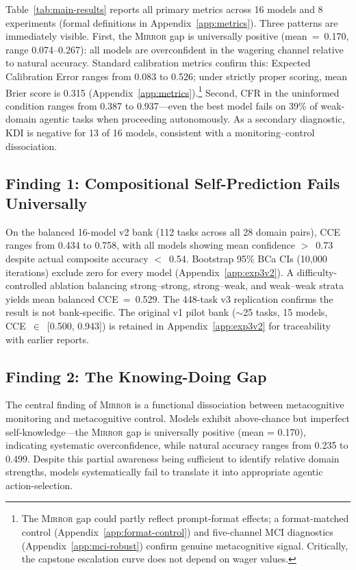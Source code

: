 \documentclass[10pt]{article}
\newcommand{\mirror}{\textsc{Mirror}}
\newcommand{\CCE}{CCE}
\newcommand{\KDI}{KDI}
\newcommand{\CFR}{CFR}
\begin{document}
Table~\ref{tab:main-results} reports all primary metrics across 16 models and 8
experiments (formal definitions in Appendix~\ref{app:metrics}). Three patterns are immediately visible. First, the \mirror{} gap is
universally positive (mean~=~0.170, range 0.074--0.267): all models are
overconfident in the wagering channel relative to natural accuracy.
Standard calibration metrics confirm this: Expected Calibration Error ranges from 0.083 to 0.526; under strictly proper scoring, mean Brier score is 0.315 (Appendix~\ref{app:metrics}).\footnote{The \mirror{} gap could partly reflect prompt-format effects; a format-matched control (Appendix~\ref{app:format-control}) and five-channel MCI diagnostics (Appendix~\ref{app:mci-robust}) confirm genuine metacognitive signal. Critically, the capstone escalation curve does not depend on wager values.}
Second, \CFR{}
in the uninformed condition ranges from 0.387 to 0.937---even the best model fails
on 39\% of weak-domain agentic tasks when proceeding autonomously. As a secondary diagnostic, \KDI{} is negative for 13 of 16 models, consistent with a monitoring--control dissociation.



\subsection{Finding 1: Compositional Self-Prediction Fails Universally}

On the balanced 16-model v2 bank (112 tasks across all 28 domain pairs), \CCE{} ranges from 0.434 to 0.758, with all models showing mean confidence $>$~0.73 despite actual composite accuracy $<$~0.54. Bootstrap 95\% BCa CIs (10{,}000 iterations) exclude zero for every model (Appendix~\ref{app:exp3v2}). A difficulty-controlled ablation balancing strong--strong, strong--weak, and weak--weak strata yields mean balanced \CCE{}~=~0.529. The 448-task v3 replication confirms the result is not bank-specific. The original v1 pilot bank (${\sim}$25 tasks, 15 models, \CCE{}~$\in$~[0.500, 0.943]) is retained in Appendix~\ref{app:exp3v2} for traceability with earlier reports.

\subsection{Finding 2: The Knowing-Doing Gap}

The central finding of \mirror{} is a functional dissociation between metacognitive
monitoring and metacognitive control. Models exhibit above-chance but imperfect self-knowledge---the \mirror{} gap is
universally positive (mean = 0.170), indicating systematic overconfidence, while
natural accuracy ranges from 0.235 to 0.499. Despite this partial awareness being
sufficient to identify relative domain strengths, models systematically fail to
translate it into appropriate agentic action-selection.
\end{document}
